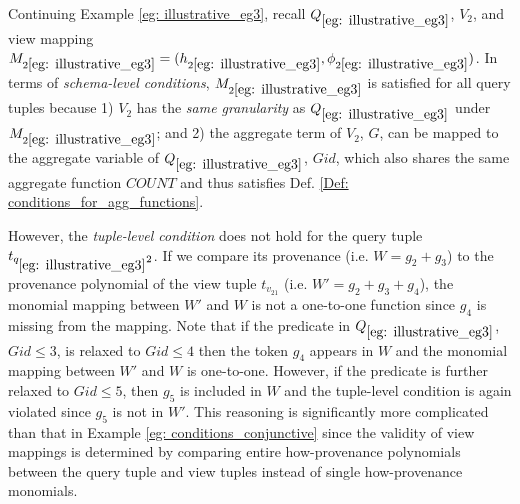 \begin{example}
Continuing Example \ref{eg: illustrative_eg3}, recall $Q_{\ref{eg: illustrative_eg3}}$, $V_2$, and view mapping $M_{2\ref{eg: illustrative_eg3}}=(h_{2\ref{eg: illustrative_eg3}},\phi_{2\ref{eg: illustrative_eg3}})$. %
In terms of {\em schema-level conditions}, $M_{2\ref{eg: illustrative_eg3}}$ is satisfied for all query tuples because 1) $V_2$ has the {\em same granularity} as $Q_{\ref{eg: illustrative_eg3}}$ under $M_{2\ref{eg: illustrative_eg3}}$; and 2) the aggregate term of $V_2$, $G$, can be mapped to the aggregate variable of $Q_{\ref{eg: illustrative_eg3}}$, $Gid$, which also shares the same aggregate function $COUNT$ and thus satisfies Def. \ref{Def: conditions_for_agg_functions}.

However, the {\em tuple-level condition} does not hold for the query tuple $t_{q_{\ref{eg: illustrative_eg3}}2}$.  If we compare its provenance (i.e. $W = g_2 + g_3$) to the provenance polynomial of the view tuple $t_{v_21}$ (i.e.
$W' = g_2 + g_3 + g_4$), the monomial mapping between $W'$ and $W$ is not a one-to-one function since $g_4$ is missing from the mapping. Note that if the predicate in $Q_{\ref{eg: illustrative_eg3}}$, $Gid \leq 3$, is relaxed to $Gid \leq 4$ then the token $g_4$ appears in $W$ and the monomial mapping between $W'$ and $W$ is one-to-one. However, if the predicate is further relaxed to $Gid \leq 5$, then $g_5$ is included in $W$ and the tuple-level condition is again violated since $g_5$ is not in $W'$. This reasoning is significantly more complicated than that in Example \ref{eg: conditions_conjunctive} since the validity of view mappings is determined by comparing entire how-provenance polynomials between the query tuple and view tuples instead of single how-provenance monomials.



\end{example}
